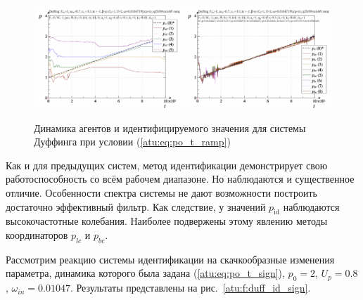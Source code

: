 \begin{figure}[ht!]
\begin{center}
  \includegraphics[width=0.49\textwidth]{p/cha/duff/duff_id-p_t_pi_ql3rlWvnAAW_ramp.png}
  \hfill
  \includegraphics[width=0.49\textwidth]{p/cha/duff/duff_id-p_t_p_ql3rlWvnAAW_ramp.png}
\end{center}
  \caption{Динамика агентов и идентифицируемого значения для системы Дуффинга при условии (\ref{atu:eq:po_t_ramp})}
\label{atu:f:duff_id_ramp}
\end{figure}

Как и для предыдущих систем, метод идентификации демонстрирует свою работоспособность
со всём рабочем диапазоне. Но наблюдаются и существенное
отличие. Особенности спектра системы не дают возможности построить достаточно эффективный
фильтр. Как следствие, у значений $p_\mathrm{id}$ наблюдаются
высокочастотные колебания. Наиболее подвержены этому явлению
методы координаторов $p_{lc}$ и $p_{bc}$.

Рассмотрим реакцию системы идентификации на скачкообразные
изменения параметра, динамика которого была задана (\ref{atu:eq:po_t_sign}),
$p_0=2$, $U_p=0.8$, $\omega_{in}=0.01047$.
Результаты представлены на рис.~\ref{atu:f:duff_id_sign}.


